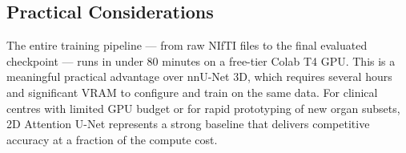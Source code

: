 \subsection{Practical Considerations}

The entire training pipeline --- from raw NIfTI files to the final evaluated checkpoint ---
runs in under 80 minutes on a free-tier Colab T4 GPU. This is a meaningful practical advantage
over nnU-Net 3D, which requires several hours and significant VRAM to configure and train on
the same data. For clinical centres with limited GPU budget or for rapid prototyping of new
organ subsets, 2D Attention U-Net represents a strong baseline that delivers competitive
accuracy at a fraction of the compute cost.
